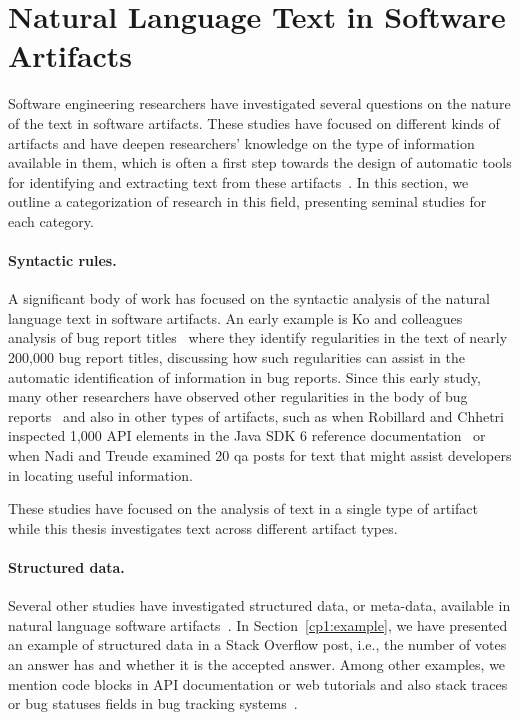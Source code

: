 \section{Natural Language Text in Software Artifacts}
\label{cp2:text-in-se}





Software engineering researchers
have investigated several questions on the nature of the text in software artifacts.
These studies 
have focused on different kinds of artifacts and have deepen
 researchers' knowledge on the type of information available in them,
 which is often a first step towards the design of automatic tools 
for identifying and extracting text from these artifacts~\cite{Arya2019, Maalej2013}.
In this section, we outline a categorization of research in this field, presenting 
seminal studies for each category.



\paragraph{\textbf{Syntactic rules.}} A significant body of work has 
focused on the syntactic analysis of the natural language text 
in software artifacts. An early example
is Ko and colleagues analysis of bug report titles~\cite{Ko2006}
where they identify regularities in the text of nearly 200,000 bug report titles,
discussing how such regularities can 
assist in the automatic identification 
of information in bug reports. 
Since this early study, many other researchers have 
observed other regularities in 
the body of bug reports~\cite{Rastkar2010, Chaparro2016}
and also in other types of artifacts, such as 
when Robillard  and Chhetri inspected 1,000 API elements in the Java SDK 6 
reference documentation~\cite{Maalej2013} or when 
Nadi and Treude examined 20 \acs{qa} posts 
for text that might assist developers in 
locating useful information.


These studies have focused on the analysis of 
text in a single type of artifact  
while this thesis investigates 
text across different artifact types.






\paragraph{\textbf{Structured data.}} Several other studies have 
investigated structured data, or meta-data, available in
natural language software artifacts~\cite{Ponzanelli2015}. In Section~\ref{cp1:example},
we have presented an example of structured data in a Stack Overflow post, 
i.e., the number of votes an answer has and whether it is the accepted answer.
Among other examples, we mention 
code blocks in API documentation or web tutorials 
and also stack traces or bug statuses fields in bug tracking systems~\cite{Breu2010}. 



